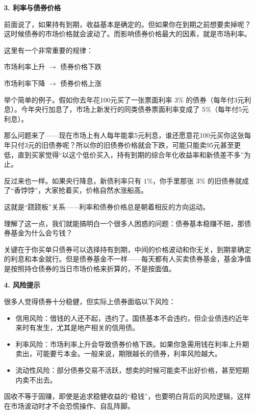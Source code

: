 \documentclass[12pt,openany]{book}
\newcommand{\subhead}[1]{%
    \par\vspace{0.5\baselineskip}%
    \noindent\textbf{#1}\par%
    \vspace{0.5\baselineskip}%
}
\begin{document}
\newpage

\subhead{3. 利率与债券价格}

前面说了，如果持有到期，收益基本是确定的。但如果你在到期之前想要卖掉呢？这时候债券的市场价格就会波动了。而影响债券价格最大的因素，就是市场利率。

这里有一个非常重要的规律：

\begin{center}
    市场利率上升 $\rightarrow$ 债券价格下跌

    市场利率下降 $\rightarrow$ 债券价格上涨
\end{center}

举个简单的例子。假如你去年花100元买了一张票面利率 $3\%$ 的债券（每年付3元利息）。今年央行加息了，市场上新发行的同类债券票面利率变成了 $5\%$（每年付5元利息）。

那么问题来了——现在市场上有人每年能拿5元利息，谁还愿意花100元买你这张每年只付3元的旧债券呢？所以你的旧债券价格就会下跌，可能只能卖95元甚至更低，直到买家觉得“以这个低价买入，持有到期的综合年化收益率和新债差不多”为止。

反过来也一样。如果央行降息，新债利率只有 $1\%$，你手里那张 $3\%$ 的旧债券就成了“香饽饽”，大家抢着买，价格自然水涨船高。

这就是“跷跷板”关系——利率和债券价格总是朝着相反的方向运动。

理解了这一点，我们就能搞明白一个很多人困惑的问题：债券基本稳赚不赔，那债券基金为什么会亏钱？

关键在于你买单只债券可以选择持有到期，中间的价格波动和你无关，到期拿确定的利息和本金就行。但是债券基金不一样——每天都有人买卖债券基金，基金净值是按照持仓债券的当日市场价格来折算的，不是按面值。

\subhead{4. 风险提示}

很多人觉得债券十分稳健，但实际上债券面临以下风险：

\begin{itemize}
    \item 信用风险：借钱的人还不起，违约了。国债基本不会违约，但企业债违约近年来时有发生，尤其是地产相关的信用债。
    \item 利率风险：市场利率上升会导致债券价格下跌。如果你急需用钱在利率上升期卖出，可能要亏本金。一般来说，期限越长的债券，利率风险越大。
    \item 流动性风险：部分债券交易不活跃，想卖的时候可能卖不出好价格，甚至短期内卖不出去。
\end{itemize}

固收不等于固赚，即使是追求稳健收益的“稳钱”，也要明白背后的风险逻辑，这样在市场波动时才不会恐慌操作、自乱阵脚。
\end{document}
